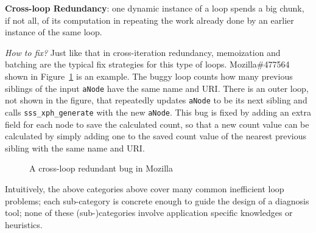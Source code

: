 {\textbf{Cross-loop Redundancy}}:
one dynamic instance of a loop spends a big chunk, if not all, of its
computation in repeating the work already done by an
earlier instance of the same loop.

{\textit{How to fix?}}
Just like that in cross-iteration redundancy, memoization and batching
are the typical fix strategies for this type of loops.
Mozilla\#477564 shown in Figure~\ref{fig:Mozilla477564} is an example. 
The buggy loop counts how many previous siblings of the input \texttt{aNode} have the same name and URI. 
There is an outer loop, not shown in the figure, that repeatedly updates
\texttt{aNode} to be its next sibling and calls
\texttt{sss\_xph\_generate} with the new \texttt{aNode}. 
This bug is fixed by adding an extra field for each node to save the calculated 
count, so that a new count value can be calculated by simply adding one to the
saved count value of the nearest previous sibling with the same name and URI.

\begin{figure}
\centering
{}
  \mbox{}
\caption{A cross-loop redundant bug in Mozilla }
\label{fig:Mozilla477564}
\end{figure}



Intuitively, the above categories above cover many common inefficient
loop problems; each sub-category is concrete enough to guide the design of a
diagnosis tool; none of these (sub-)categories involve application
specific knowledges or heuristics.
